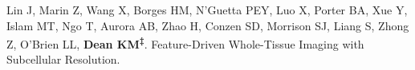\begin{etaremune}


\item Lin J, Marin Z, Wang X, Borges HM, N’Guetta PEY, Luo X, Porter BA, Xue Y, Islam MT, Ngo T, Aurora AB, Zhao H, Conzen SD, Morrison SJ, Liang S, Zhong Z, O’Brien LL, \textbf{Dean KM\textsuperscript{‡}}. Feature-Driven Whole-Tissue Imaging with Subcellular Resolution. 

\end{etaremune}